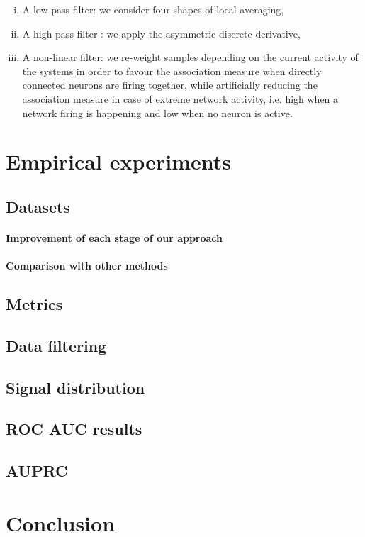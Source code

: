 \documentclass[wcp]{jmlr}
\begin{document}
\begin{enumerate}[i.]
\item A low-pass filter: we consider four shapes of local averaging,
\item A high pass filter : we apply the asymmetric discrete derivative,
\item A non-linear filter: we re-weight samples depending on the current
    activity of the systems in order to favour the association measure when
    directly connected neurons are     firing together, while artificially
    reducing the association measure in case of extreme network activity, i.e.
    high when a network firing is happening and low when no neuron is active.
\end{enumerate}

\section{Empirical experiments}
\subsection{Datasets}

\paragraph{Improvement of each stage of our approach\\}
\paragraph{Comparison with other methods\\}

\subsection{Metrics}
\subsection{Data filtering}
\subsection{Signal distribution}
\subsection{ROC AUC results}
\subsection{AUPRC}

\section{Conclusion}




\end{document}
